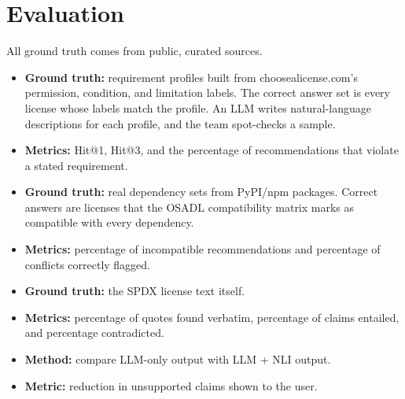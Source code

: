 \documentclass[11pt]{article}
\begin{document}
\section{Evaluation}

All ground truth comes from public, curated sources.

\begin{description}[leftmargin=0pt,style=nextline]
  \item[Recommendation from a description]
  \begin{itemize}
    \item \textbf{Ground truth:} requirement profiles built from choosealicense.com's permission, condition, and limitation labels. The correct answer set is every license whose labels match the profile. An LLM writes natural-language descriptions for each profile, and the team spot-checks a sample.
    \item \textbf{Metrics:} Hit@1, Hit@3, and the percentage of recommendations that violate a stated requirement.
  \end{itemize}

  \item[Recommendation from a manifest]
  \begin{itemize}
    \item \textbf{Ground truth:} real dependency sets from PyPI/npm packages. Correct answers are licenses that the OSADL compatibility matrix marks as compatible with every dependency.
    \item \textbf{Metrics:} percentage of incompatible recommendations and percentage of conflicts correctly flagged.
  \end{itemize}

  \item[Explanation faithfulness]
  \begin{itemize}
    \item \textbf{Ground truth:} the SPDX license text itself.
    \item \textbf{Metrics:} percentage of quotes found verbatim, percentage of claims entailed, and percentage contradicted.
  \end{itemize}

  \item[Effect of the verifier]
  \begin{itemize}
    \item \textbf{Method:} compare LLM-only output with LLM + NLI output.
    \item \textbf{Metric:} reduction in unsupported claims shown to the user.
  \end{itemize}


\end{description}
\end{document}
